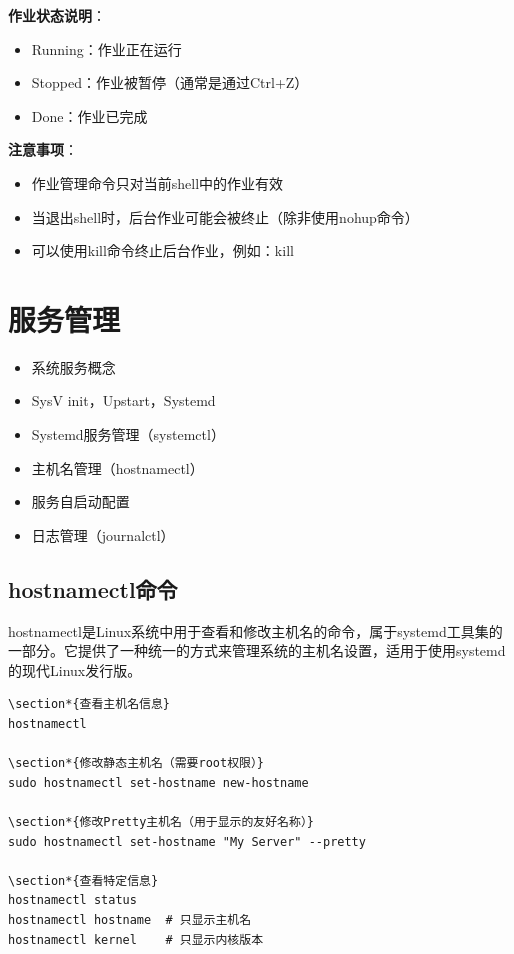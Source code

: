 \documentclass[12pt,UTF8]{ctexbook}
\begin{document}
\textbf{作业状态说明}：
\begin{itemize}
    \item Running：作业正在运行
    \item Stopped：作业被暂停（通常是通过Ctrl+Z）
    \item Done：作业已完成
\end{itemize}

\textbf{注意事项}：
\begin{itemize}
    \item 作业管理命令只对当前shell中的作业有效
    \item 当退出shell时，后台作业可能会被终止（除非使用nohup命令）
    \item 可以使用kill命令终止后台作业，例如：kill %
\end{itemize}

\section{服务管理}
\begin{itemize}
    \item 系统服务概念
    \item SysV init，Upstart，Systemd
    \item Systemd服务管理（systemctl）
    \item 主机名管理（hostnamectl）
    \item 服务自启动配置
    \item 日志管理（journalctl）
\end{itemize}

\subsection{hostnamectl命令}
hostnamectl是Linux系统中用于查看和修改主机名的命令，属于systemd工具集的一部分。它提供了一种统一的方式来管理系统的主机名设置，适用于使用systemd的现代Linux发行版。

\begin{verbatim}
\section*{查看主机名信息}
hostnamectl

\section*{修改静态主机名（需要root权限）}
sudo hostnamectl set-hostname new-hostname

\section*{修改Pretty主机名（用于显示的友好名称）}
sudo hostnamectl set-hostname "My Server" --pretty

\section*{查看特定信息}
hostnamectl status
hostnamectl hostname  # 只显示主机名
hostnamectl kernel    # 只显示内核版本
\end{verbatim}
\end{document}
